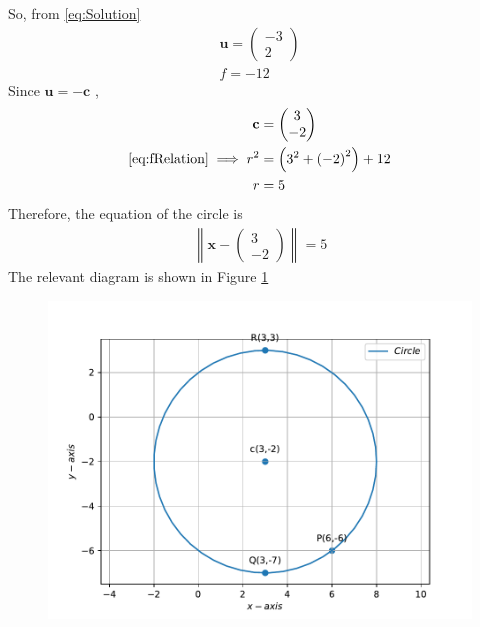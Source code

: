 \documentclass[12pt]{article}
\providecommand{\brak}[1]{\ensuremath{\left(#1\right)}}
\providecommand{\norm}[1]{\left\lVert#1\right\rVert}
\newcommand{\myvec}[1]{\ensuremath{\begin{pmatrix}#1\end{pmatrix}}}
\let\vec\mathbf
\begin{document}
\begin{enumerate}
So, from  \eqref{eq:Solution} 
\begin{align}
	\vec{u} = \myvec{-3 \\ 2} \\ 
	f = -12 
\end{align}
Since $\vec{u} = -\vec{c}$ , 
\begin{align}
	\vec{c} &= \myvec{ 3 \\ -2} \\
	\eqref{eq:fRelation} \implies r^2 &= \brak{3^2 + \brak{-2}^2} + 12 \\
	 r &= 5
\end{align}
Therefore, the equation of the circle is 
\begin{align}
	\norm{\vec{x}-\myvec{3 \\ -2}}  = 5 
\end{align}
The relevant diagram is shown in Figure \ref{fig:Fig1}
\begin{figure}[!h]
	\begin{center}
		\includegraphics[width=\columnwidth]{./figs/problem3.pdf}
	\end{center}
\caption{}
\label{fig:Fig1}
\end{figure}
\end{enumerate}
\end{document}

